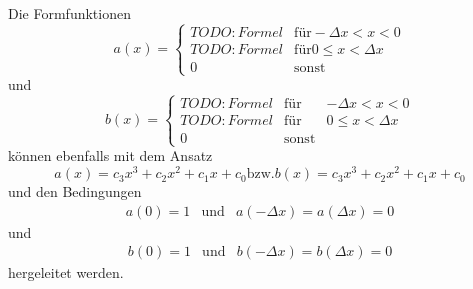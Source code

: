 Die Formfunktionen
\begin{equation}
    a(x) = \left\{ \begin{array}{rcl}
        TODO: Formel & \text{für} -\Delta x < x < 0 \\
        TODO: Formel & \text{für} 0 \leq x < \Delta x \\
        0            & \text{sonst}
    \end{array} \right.
\end{equation}
und
\begin{equation}
    b(x) = \left\{ \begin{array}{rcl}
        TODO: Formel & \text{für} & -\Delta x < x < 0 \\
        TODO: Formel & \text{für} & 0 \leq x < \Delta x \\
        0            & \text{sonst}
    \end{array} \right.
\end{equation}
können ebenfalls mit dem Ansatz
\begin{equation}
    a(x) = c_3x^3 + c_2x^2 + c_1x + c_0 \text{bzw.} b(x) = c_3x^3 + c_2x^2 + c_1x + c_0
\end{equation}
und den Bedingungen 
\begin{equation}
    \begin{array}{ccc}
        a(0) = 1 & \text{und} & a(-\Delta x) = a(\Delta x) = 0
    \end{array}
\end{equation}
und
\begin{equation}
    \begin{array}{ccc}
        b(0) = 1 & \text{und} & b(-\Delta x) = b(\Delta x) = 0
    \end{array}
\end{equation}
hergeleitet werden.


